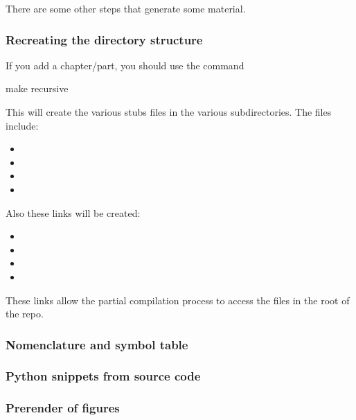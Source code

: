 There are some other steps that generate some material.

\subsubsection{Recreating the directory structure}

If you add a chapter/part, you should use the command

\begin{console}
    make recursive
\end{console}

This will create the various stubs files in the various subdirectories.
The files include:
\begin{itemize}
    \item {}
    \item {}
    \item {}
    \item {}
\end{itemize}
Also these links will be created:
\begin{itemize}
    \item {}
    \item {}
    \item {}
    \item {}
\end{itemize}
These links allow the partial compilation process to access the files in the root of the repo.

\subsubsection{Nomenclature and symbol table}


\subsubsection{Python snippets from source code}


\subsubsection{Prerender of figures}

